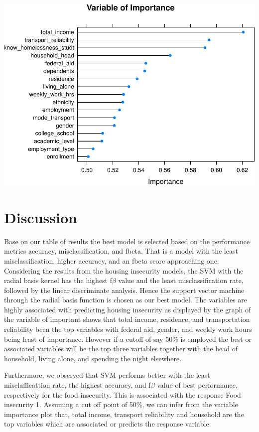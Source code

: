 \documentclass[
  10pt,
]{article}
\begin{document}
\includegraphics{phase1_report_files/figure-latex/unnamed-chunk-13-1}

\hypertarget{discussion}{%
\section{Discussion}\label{discussion}}

Base on our table of results the best model is selected based on the performance metrics accuracy, misclassification, and fbeta. That is a model with the least misclassification, higher accuracy, and an fbeta score approaching one. Considering the results from the housing insecurity models, the SVM with the radial basis kernel has the highest f\(\beta\) value and the least misclassification rate, followed by the linear discriminate analysis. Hence the support vector machine through the radial basis function is chosen as our best model. The variables are highly associated with predicting housing insecurity as displayed by the graph of the variable of important shows that total income, residence, and transportation reliability been the top variables with federal aid, gender, and weekly work hours being least of importance. However if a cutoff of say 50\% is employed the best or associated variables will be the top three variables together with the head of household, living alone, and spending the night elsewhere.

Furthermore, we observed that SVM performs better with the least misclafficattion rate, the highest accuracy, and f\(\beta\) value of best performance, respectively for the food insecurity. This is associated with the response Food insecurity 1. Assuming a cut off point of 50\%, we can infer from the variable importance plot that, total income, transport reliability and household are the top variables which are associated or predicts the response variable.
\end{document}
